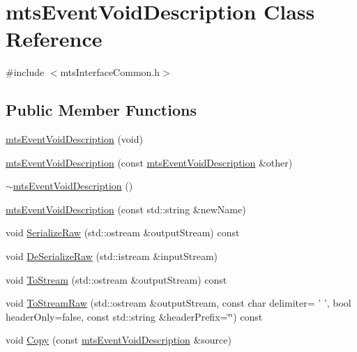 \hypertarget{classmts_event_void_description}{\section{mts\-Event\-Void\-Description Class Reference}
\label{classmts_event_void_description}
}


{\ttfamily \#include $<$mts\-Interface\-Common.\-h$>$}

\subsection*{Public Member Functions}
\begin{DoxyCompactItemize}
\item 
\hyperlink{classmts_event_void_description_a88de1af5f03ea4316b965b8ba882a80b}{mts\-Event\-Void\-Description} (void)
\item 
\hyperlink{classmts_event_void_description_a56884037acfd87b2f19874288d9f515f}{mts\-Event\-Void\-Description} (const \hyperlink{classmts_event_void_description}{mts\-Event\-Void\-Description} \&other)
\item 
\hyperlink{classmts_event_void_description_a27bab1931d43f8086e7eab1d562c8835}{$\sim$mts\-Event\-Void\-Description} ()
\item 
\hyperlink{classmts_event_void_description_aa238ca5aec769bc330cc8f177a1f4e4d}{mts\-Event\-Void\-Description} (const std\-::string \&new\-Name)
\item 
void \hyperlink{classmts_event_void_description_a9ca7cb2c40a8e0fbc4eb9c482502562d}{Serialize\-Raw} (std\-::ostream \&output\-Stream) const 
\item 
void \hyperlink{classmts_event_void_description_ae2c3bf5af7d3235d3740ff757cadc795}{De\-Serialize\-Raw} (std\-::istream \&input\-Stream)
\item 
void \hyperlink{classmts_event_void_description_a33b4477bfc8a1a8aca76b7acca62592f}{To\-Stream} (std\-::ostream \&output\-Stream) const 
\item 
void \hyperlink{classmts_event_void_description_aa550762ac229bccc45009137c89a19a3}{To\-Stream\-Raw} (std\-::ostream \&output\-Stream, const char delimiter= ' ', bool header\-Only=false, const std\-::string \&header\-Prefix=\char`\"{}\char`\"{}) const 
\item 
void \hyperlink{classmts_event_void_description_afeec1eee7183472c9f4614f935c312e0}{Copy} (const \hyperlink{classmts_event_void_description}{mts\-Event\-Void\-Description} \&source)

\end{DoxyCompactItemize}
